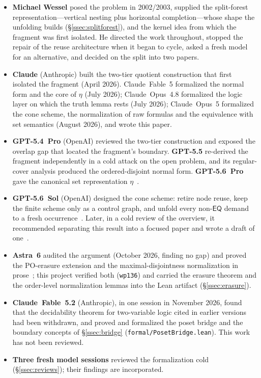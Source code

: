 \documentclass[11pt]{article}
\newcommand{\EQ}{\mathsf{EQ}}
\theoremstyle{plain}
\theoremstyle{definition}
\begin{document}
\begin{itemize}
  \item \textbf{Michael Wessel} posed the problem in 2002/2003, supplied the
    split-forest representation---vertical nesting plus horizontal
    completion---whose shape the unfolding builds (\S\ref{ssec:splitforest}),
    and the kernel idea from which
    the fragment was first isolated. He directed the work throughout, stopped
    the repair of the reuse architecture when it began to cycle, asked a fresh
    model for an alternative, and decided on the split into two papers.
  \item \textbf{Claude} (Anthropic) built the two-tier quotient construction
    that first isolated the fragment (April 2026). Claude~Fable~5 formalized the
    normal form and the core of $\eta$ (July 2026); Claude~Opus~4.8 formalized
    the logic layer on which the truth lemma rests (July 2026); Claude~Opus~5
    formalized the cone scheme, the normalization of raw formulas and the
    equivalence with set semantics (August 2026), and wrote this paper.
  \item \textbf{GPT-5.4~Pro} (OpenAI) reviewed the two-tier construction and
    exposed the overlap gap that located the fragment's boundary.
    \textbf{GPT-5.5} re-derived the fragment independently in a cold attack on
    the open problem, and its regular-cover analysis produced the
    ordered-disjoint normal form. \textbf{GPT-5.6~Pro} gave the canonical set
    representation $\eta$~\cite{GPT56TechNote}.
  \item \textbf{GPT-5.6~Sol} (OpenAI) designed the cone scheme: retire node
    reuse, keep the finite scheme only as a control graph, and unfold every
    non-$\EQ$ demand to a fresh occurrence~\cite{GPT56Sol}. Later, in a cold
    review of the overview, it recommended separating this result into a
    focused paper and wrote a draft of one~\cite{GPT56SolReview}.
  \item \textbf{Astra~6} audited the argument (October 2026, finding no gap)
    and proved the PO-erasure extension and the maximal-disjointness
    normalization in prose~\cite{Astra6Review}; this project verified both
    (\texttt{wp136}) and carried the erasure theorem and the order-level
    normalization lemmas into the Lean artifact (\S\ref{ssec:erasure}).
  \item \textbf{Claude~Fable~5.2} (Anthropic), in one session in November 2026,
    found that the decidability theorem for two-variable logic cited in earlier
    versions had been withdrawn, and proved and formalized the poset bridge and
    the boundary concepts of \S\ref{ssec:bridge}
    (\texttt{formal/PosetBridge.lean}). This work has not been reviewed.
  \item \textbf{Three fresh model sessions} reviewed the formalization cold
    (\S\ref{ssec:reviews}); their findings are incorporated.
\end{itemize}
\end{document}
